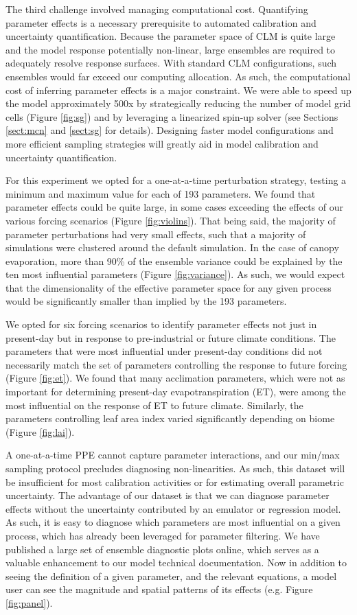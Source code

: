 \documentclass[draft]{agujournal2019}
\begin{document}
The third challenge involved managing computational cost.  Quantifying parameter effects is a necessary prerequisite to automated calibration and uncertainty quantification. Because the parameter space of CLM is quite large and the model response potentially non-linear, large ensembles are required to adequately resolve response surfaces. With standard CLM configurations, such ensembles would far exceed our computing allocation. As such, the computational cost of inferring parameter effects is a major constraint. We were able to speed up the model approximately 500x by strategically reducing the number of model grid cells (Figure \ref{fig:sg}) and by leveraging a linearized spin-up solver (see Sections \ref{sect:mcn} and \ref{sect:sg} for details). Designing faster model configurations and more efficient sampling strategies will greatly aid in model calibration and uncertainty quantification. 

For this experiment we opted for a one-at-a-time perturbation strategy, testing a minimum and maximum value for each of 193 parameters. We found that parameter effects could be quite large, in some cases exceeding the effects of our various forcing scenarios (Figure \ref{fig:violins}). That being said, the majority of parameter perturbations had very small effects, such that a majority of simulations were clustered around the default simulation. In the case of canopy evaporation, more than 90\% of the ensemble variance could be explained by the ten most influential parameters (Figure \ref{fig:variance}). As such, we would expect that the dimensionality of the effective parameter space for any given process would be significantly smaller than implied by the 193 parameters.

We opted for six forcing scenarios to identify parameter effects not just in present-day but in response to pre-industrial or future climate conditions. The parameters that were most influential under present-day conditions did not necessarily match the set of parameters controlling the response to future forcing (Figure \ref{fig:et}). We found that many acclimation parameters, which were not as important for determining present-day evapotranspiration (ET), were among the most influential on the response of ET to future climate. Similarly, the parameters controlling leaf area index varied significantly depending on biome (Figure \ref{fig:lai}).

A one-at-a-time PPE cannot capture parameter interactions, and our min/max sampling protocol precludes diagnosing non-linearities. As such, this dataset will be insufficient for most calibration activities or for estimating overall parametric uncertainty. The advantage of our dataset is that we can diagnose parameter effects without the uncertainty contributed by an  emulator or regression model. As such, it is easy to diagnose which parameters are most influential on a given process, which has already been leveraged for parameter filtering. We have published a large set of ensemble diagnostic plots online, which serves as a valuable enhancement to our model technical documentation. Now in addition to seeing the definition of a given parameter, and the relevant equations, a model user can see the magnitude and spatial patterns of its effects (e.g. Figure \ref{fig:panel}).
\end{document}
